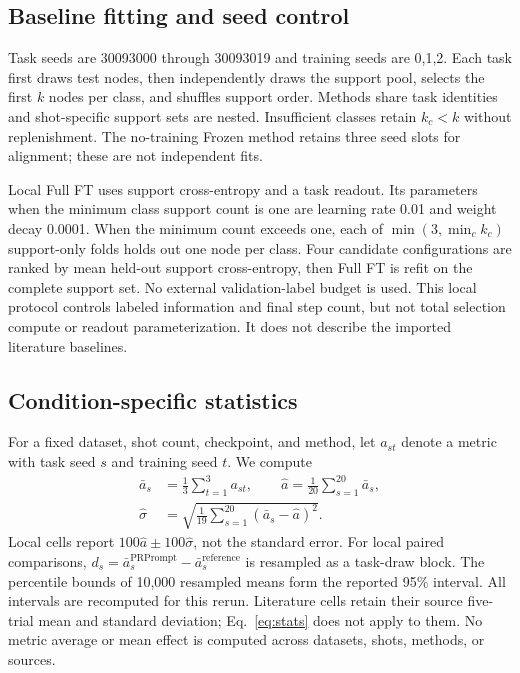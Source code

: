 \subsection{Baseline fitting and seed control}
Task seeds are 30093000 through 30093019 and training seeds are 0,1,2. Each task first draws test nodes, then independently draws the support pool, selects the first $k$ nodes per class, and shuffles support order. Methods share task identities and shot-specific support sets are nested. Insufficient classes retain $k_c<k$ without replenishment. The no-training Frozen method retains three seed slots for alignment; these are not independent fits.

Local Full FT uses support cross-entropy and a task readout. Its parameters when the minimum class support count is one are learning rate 0.01 and weight decay 0.0001. When the minimum count exceeds one, each of $\min(3,\min_c k_c)$ support-only folds holds out one node per class. Four candidate configurations are ranked by mean held-out support cross-entropy, then Full FT is refit on the complete support set. No external validation-label budget is used. This local protocol controls labeled information and final step count, but not total selection compute or readout parameterization. It does not describe the imported literature baselines.

\subsection{Condition-specific statistics}
For a fixed dataset, shot count, checkpoint, and method, let $a_{st}$ denote a metric with task seed $s$ and training seed $t$. We compute
\begin{equation}
\begin{aligned}
\bar a_s&=\frac13\sum_{t=1}^{3}a_{st},\qquad
\widehat a=\frac1{20}\sum_{s=1}^{20}\bar a_s,\\
\widehat\sigma&=\sqrt{\frac1{19}\sum_{s=1}^{20}(\bar a_s-\widehat a)^2}.
\end{aligned}
\label{eq:stats}
\end{equation}
Local cells report $100\widehat a\pm100\widehat\sigma$, not the standard error. For local paired comparisons, $d_s=\bar a_s^{\mathrm{PRPrompt}}-\bar a_s^{\mathrm{reference}}$ is resampled as a task-draw block. The percentile bounds of 10,000 resampled means form the reported 95\% interval. All intervals are recomputed for this rerun. Literature cells retain their source five-trial mean and standard deviation; Eq.~\eqref{eq:stats} does not apply to them. No metric average or mean effect is computed across datasets, shots, methods, or sources.


